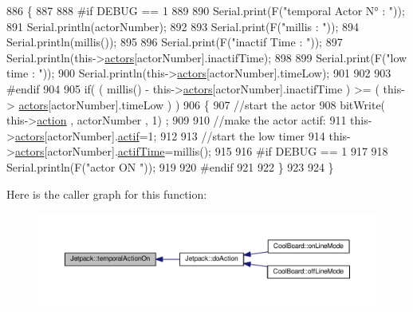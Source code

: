 \begin{DoxyCode}
886 \{
887 
888 \textcolor{preprocessor}{#if DEBUG == 1}
889     
890     Serial.print(F(\textcolor{stringliteral}{"temporal Actor N° : "}));
891     Serial.println(actorNumber);
892 
893     Serial.print(F(\textcolor{stringliteral}{"millis : "}));
894     Serial.println(millis());
895 
896     Serial.print(F(\textcolor{stringliteral}{"inactif Time : "}));
897     Serial.println(this->\hyperlink{class_jetpack_a7e16d2f97837f9712a2e6de1c50d99db}{actors}[actorNumber].inactifTime);
898 
899     Serial.print(F(\textcolor{stringliteral}{"low time : "}));
900     Serial.println(this->\hyperlink{class_jetpack_a7e16d2f97837f9712a2e6de1c50d99db}{actors}[actorNumber].timeLow);
901 
902 
903 \textcolor{preprocessor}{#endif}
904     
905      \textcolor{keywordflow}{if}( ( millis() - this->\hyperlink{class_jetpack_a7e16d2f97837f9712a2e6de1c50d99db}{actors}[actorNumber].inactifTime ) >= (  this->
      \hyperlink{class_jetpack_a7e16d2f97837f9712a2e6de1c50d99db}{actors}[actorNumber].timeLow  ) )
906     \{
907         \textcolor{comment}{//start the actor}
908         bitWrite( this->\hyperlink{class_jetpack_aca3142925a7b0834b34ae91d26af7765}{action} , actorNumber , 1) ;
909 
910         \textcolor{comment}{//make the actor actif:}
911         this->\hyperlink{class_jetpack_a7e16d2f97837f9712a2e6de1c50d99db}{actors}[actorNumber].\hyperlink{struct_jetpack_1_1state_aa177541689bbaea21a4650a083b0df77}{actif}=1;
912 
913         \textcolor{comment}{//start the low timer}
914         this->\hyperlink{class_jetpack_a7e16d2f97837f9712a2e6de1c50d99db}{actors}[actorNumber].\hyperlink{struct_jetpack_1_1state_af2e1cc323ef9ffcc3cf4d203f85d726b}{actifTime}=millis();
915 
916 \textcolor{preprocessor}{    #if DEBUG == 1 }
917 
918         Serial.println(F(\textcolor{stringliteral}{"actor ON "}));
919 
920 \textcolor{preprocessor}{    #endif              }
921 
922     \}
923 
924 \}
\end{DoxyCode}
Here is the caller graph for this function\+:\nopagebreak
\begin{figure}[H]
\begin{center}
\leavevmode
\includegraphics[width=350pt]{df/d1d/class_jetpack_ad011d904f639accb5f94ef806846ef59_icgraph}
\end{center}
\end{figure}
\mbox{\label{class_jetpack_a338f1af8cbc6504ac69b47c7328569b5}} 
